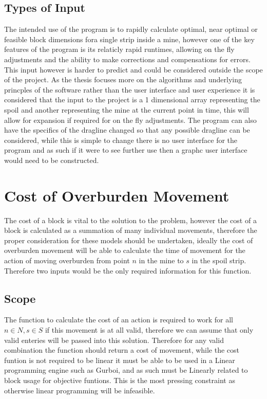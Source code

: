 \subsection{Types of Input}
The intended use of the program is to rapidly calculate optimal, near optimal or feasible block dimensions fora single strip inside a mine, however one of the key features of the program is its relaticly rapid runtimes, allowing on the fly adjustments and the ability to make corrections and compensations for errors. This input however is harder to predict and could be considered outside the scope of the project. As the thesis focuses more on the algorithms and underlying princples of the software rather than the user interface and user experience it is considered that the input to the project is a 1 dimensional array representing the spoil and another representing the mine at the current point in time, this will allow for expansion if required for on the fly adjustments. The program can also have the specifics of the dragline changed so that any possible dragline can be considered, while this is simple to change there is no user interface for the program and as such if it were to see further use then a graphc user interface would need to be constructed. \\


\section{Cost of Overburden Movement}
The cost of a block is vital to the solution to the problem, however the cost of a block is calculated as a summation of many individual movements, therefore the proper consideration for these models should be undertaken, ideally the cost of overburden movement will be able to calculate the time of movement for the action of moving overburden from point $n$ in the mine to $s$ in the spoil strip. Therefore two inputs would be the only required information for this function.
\subsection{Scope}
The function to calculate the cost of an action is required to work for all $n\in N , s \in S$ if this movement is at all valid, therefore we can assume that only valid enteries will be passed into this solution. Therefore for any valid combination the function should return a cost of movement, while the cost funtion is not required to be linear it must be able to be used in a Linear programming engine such as Gurboi, and as such must be Linearly related to block usage for objective funtions. This is the most pressing constraint as otherwise linear programming will be infeasible.
